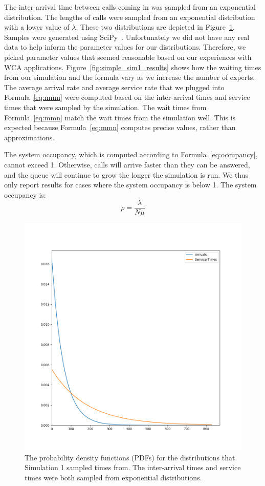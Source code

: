 The inter-arrival time between calls coming in was sampled from an exponential
distribution.
The lengths of calls were sampled from an exponential distribution with
a lower value of $\lambda$.
These two distributions are depicted in Figure~\ref{fig:simple_sim1_dists}.
Samples were generated using SciPy~\cite{scipy}.
Unfortunately we did not have any real data to help inform the parameter values
for our distributions.
Therefore, we picked parameter values that seemed reasonable based on our
experiences with WCA applications.
Figure~\ref{fig:simple_sim1_results} shows how the waiting times from our
simulation and the formula vary as we increase the number of experts.
The average arrival rate and average service rate that we plugged into
Formula~\ref{eq:mmn} were computed based on the inter-arrival times and service
times that were sampled by the simulation.
The wait times from Formula~\ref{eq:mmn} match the wait times from the
simulation well.
This is expected because Formula~\ref{eq:mmn} computes precise values, rather
than approximations.

The system occupancy, which is computed according to Formula~\ref{eq:occupancy},
cannot exceed 1.
Otherwise, calls will arrive faster than they can be answered, and the queue
will continue to grow the longer the simulation is run.
We thus only report results for cases where the system occupancy is below 1.
The system occupancy is:
\begin{equation}
\rho = \frac{\lambda}{N \mu}
\label{eq:occupancy}
\end{equation}

\begin{figure}[H]
  \includegraphics[width=\textwidth]{figures/montecarlo/expon_expon.png}
  \caption{
    The probability density functions (PDFs) for the distributions that
    Simulation 1 sampled times from.
    The inter-arrival times and service times were both sampled from
    exponential distributions.
  }\label{fig:simple_sim1_dists}
\end{figure}

